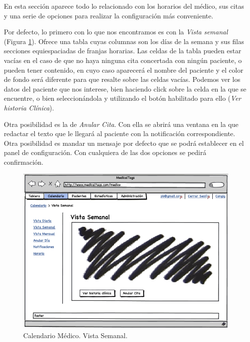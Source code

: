 			En esta sección aparece todo lo relacionado con los horarios del médico, sus citas y una serie de opciones para realizar la configuración  más conveniente.
			
			Por defecto, lo primero con lo que nos encontramos es con la \textit{Vista semanal} (Figura \ref{fig:iu_calendario_vista_semanal}). Ofrece una tabla cuyas columnas son los días de la semana y sus filas secciones equiespaciadas de franjas horarias. Las celdas de la tabla pueden estar vacías en el caso de que no haya ninguna cita concertada con ningún paciente, o pueden tener contenido, en cuyo caso aparecerá el nombre del paciente y el color de fondo será diferente para que resalte sobre las celdas vacías. Podemos ver los datos del paciente que nos interese, bien haciendo click sobre la celda en la que se encuentre, o bien seleccionándola y utilizando el botón habilitado para ello (\textit{Ver historia Clínica}). 
			
			Otra posibilidad es la de \textit{Anular Cita}. Con ella se abrirá una ventana en la que redactar el texto que le llegará al paciente con la notificación correspondiente. Otra posibilidad es mandar un mensaje por defecto que se podrá establecer en el panel de configuración. Con cualquiera de las dos opciones se pedirá confirmación.			
			
			
			\begin{figure}[H]
			  \centering
			    \includegraphics[width=12cm]{img/png/interfaz/13_Calendario_Medico.png}
			  \caption{Calendario Médico. Vista Semanal.}
			  \label{fig:iu_calendario_vista_semanal}
			\end{figure}
			
